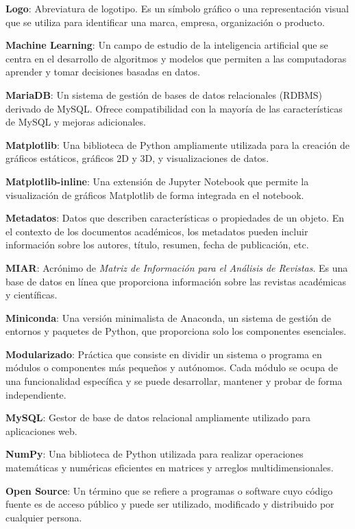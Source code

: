 \textbf{Logo}: Abreviatura de logotipo. Es un símbolo gráfico o una representación visual que se utiliza para identificar una marca, empresa, organización o producto. 

\textbf{Machine Learning}: Un campo de estudio de la inteligencia artificial que se centra en el desarrollo de algoritmos y modelos que permiten a las computadoras aprender y tomar decisiones basadas en datos.

\textbf{MariaDB}: Un sistema de gestión de bases de datos relacionales (RDBMS) derivado de MySQL. Ofrece compatibilidad con la mayoría de las características de MySQL y mejoras adicionales.

\textbf{Matplotlib}: Una biblioteca de Python ampliamente utilizada para la creación de gráficos estáticos, gráficos 2D y 3D, y visualizaciones de datos.

\textbf{Matplotlib-inline}: Una extensión de Jupyter Notebook que permite la visualización de gráficos Matplotlib de forma integrada en el notebook.

\textbf{Metadatos}: Datos que describen características o propiedades de un objeto. En el contexto de los documentos académicos, los metadatos pueden incluir información sobre los autores, título, resumen, fecha de publicación, etc.

\textbf{MIAR}: Acrónimo de \textit{Matriz de Información para el Análisis de Revistas}. Es una base de datos en línea que proporciona información sobre las revistas académicas y científicas.

\textbf{Miniconda}: Una versión minimalista de Anaconda, un sistema de gestión de entornos y paquetes de Python, que proporciona solo los componentes esenciales.

\textbf{Modularizado}: Práctica que consiste en dividir un sistema o programa en módulos o componentes más pequeños y autónomos. Cada módulo se ocupa de una funcionalidad específica y se puede desarrollar, mantener y probar de forma independiente.

\textbf{MySQL}: Gestor de base de datos relacional ampliamente utilizado para aplicaciones web.

\textbf{NumPy}: Una biblioteca de Python utilizada para realizar operaciones matemáticas y numéricas eficientes en matrices y arreglos multidimensionales.

\textbf{Open Source}: Un término que se refiere a programas o software cuyo código fuente es de acceso público y puede ser utilizado, modificado y distribuido por cualquier persona.

